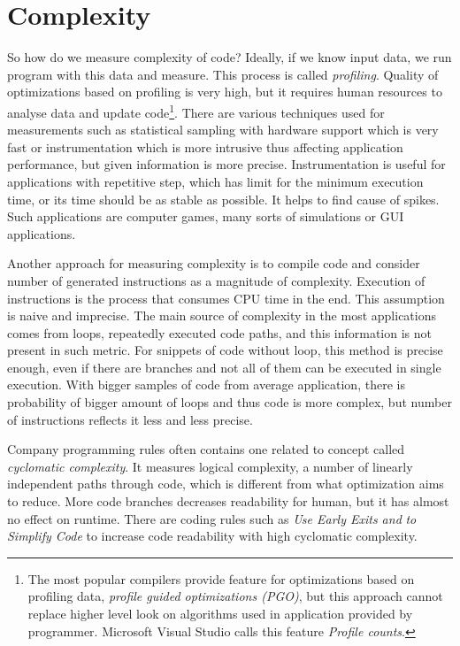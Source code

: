\section{Complexity}
\label{yield-complexity}
So how do we measure complexity of code? Ideally, if we know input data, we run program with this data and measure. This process is called \emph{profiling}. Quality of optimizations based on profiling is very high, but it requires human resources to analyse data and update code\footnote{The most popular compilers provide feature for optimizations based on profiling data, \emph{profile guided optimizations (PGO)}, but this approach cannot replace higher level look on algorithms used in application provided by programmer. Microsoft Visual Studio calls this feature \emph{Profile counts}.}. There are various techniques used for measurements such as statistical sampling with hardware support which is very fast or instrumentation which is more intrusive thus affecting application performance, but given information is more precise. Instrumentation is useful for applications with repetitive step, which has limit for the minimum execution time, or its time should be as stable as possible. It helps to find cause of spikes. Such applications are computer games, many sorts of simulations or GUI applications.

Another approach for measuring complexity is to compile code and consider number of generated instructions as a magnitude of complexity. Execution of instructions is the process that consumes CPU time in the end. This assumption is naive and imprecise. The main source of complexity in the most applications comes from loops, repeatedly executed code paths, and this information is not present in such metric. For snippets of code without loop, this method is precise enough, even if there are branches and not all of them can be executed in single execution. With bigger samples of code from average application, there is probability of bigger amount of loops and thus code is more complex, but number of instructions reflects it less and less precise.

Company programming rules often contains one related to concept called \emph{cyclomatic complexity}. It measures logical complexity, a number of linearly independent paths through code, which is different from what optimization aims to reduce. More code branches decreases readability for human, but it has almost no effect on runtime. There are coding rules such as \emph{Use Early Exits and}  \emph{to Simplify Code} \cite{llvm-coding-standards} to increase code readability with high cyclomatic complexity.

